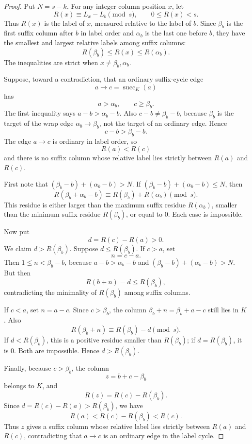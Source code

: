 \documentclass[10pt]{article}
\begin{document}
\begin{proof}
Put \(N=s-k\).  For any integer column position \(x\), let
\[
  R(x)\equiv L_x-L_b\pmod s,\qquad 0\le R(x)<s.
\]
Thus \(R(x)\) is the label of \(x\), measured relative to the label of \(b\).
Since \(\beta_b\) is the first suffix column after \(b\) in label order and
\(\alpha_b\) is the last one before \(b\), they have the smallest and largest
relative labels among suffix columns:
\[
  R(\beta_b)\le R(x)\le R(\alpha_b).
\]
The inequalities are strict when \(x\ne\beta_b,\alpha_b\).

Suppose, toward a contradiction, that an ordinary suffix-cycle edge
\[
  a\to c=\operatorname{succ}_K(a)
\]
has
\[
  a>\alpha_b,\qquad c\ge\beta_b.
\]
The first inequality says \(a-b>\alpha_b-b\).  Also
\(c-b\ne\beta_b-b\), because \(\beta_b\) is the target of the wrap edge
\(\alpha_b\to\beta_b\), not the target of an ordinary edge.  Hence
\[
  c-b>\beta_b-b.
\]
The edge \(a\to c\) is ordinary in label order, so
\[
  R(a)<R(c)
\]
and there is no suffix column whose relative label lies strictly between
\(R(a)\) and \(R(c)\).

First note that \((\beta_b-b)+(\alpha_b-b)>N\).  If
\((\beta_b-b)+(\alpha_b-b)\le N\), then
\[
  R(\beta_b+\alpha_b-b)
  \equiv
  R(\beta_b)+R(\alpha_b)\pmod s.
\]
This residue is either larger than the maximum suffix residue
\(R(\alpha_b)\), smaller than the minimum suffix residue \(R(\beta_b)\),
or equal to \(0\).  Each case is impossible.

Now put
\[
  d=R(c)-R(a)>0.
\]
We claim \(d>R(\beta_b)\).  Suppose \(d\le R(\beta_b)\).  If \(c>a\), set
\[
  n=c-a.
\]
Then \(1\le n<\beta_b-b\), because \(a-b>\alpha_b-b\) and
\((\beta_b-b)+(\alpha_b-b)>N\).  But then
\[
  R(b+n)=d\le R(\beta_b),
\]
contradicting the minimality of \(R(\beta_b)\) among suffix columns.

If \(c<a\), set \(n=a-c\).  Since \(c>\beta_b\), the column
\(\beta_b+n=\beta_b+a-c\) still lies in \(K\).  Also
\[
  R(\beta_b+n)\equiv R(\beta_b)-d\pmod s.
\]
If \(d<R(\beta_b)\), this is a positive residue smaller than \(R(\beta_b)\);
if \(d=R(\beta_b)\), it is \(0\).  Both are impossible.  Hence
\(d>R(\beta_b)\).

Finally, because \(c>\beta_b\), the column
\[
  z=b+c-\beta_b
\]
belongs to \(K\), and
\[
  R(z)=R(c)-R(\beta_b).
\]
Since \(d=R(c)-R(a)>R(\beta_b)\), we have
\[
  R(a)<R(c)-R(\beta_b)<R(c).
\]
Thus \(z\) gives a suffix column whose relative label lies strictly between
\(R(a)\) and \(R(c)\),
contradicting that \(a\to c\) is an ordinary edge in the label cycle.
\end{proof}
\end{document}
